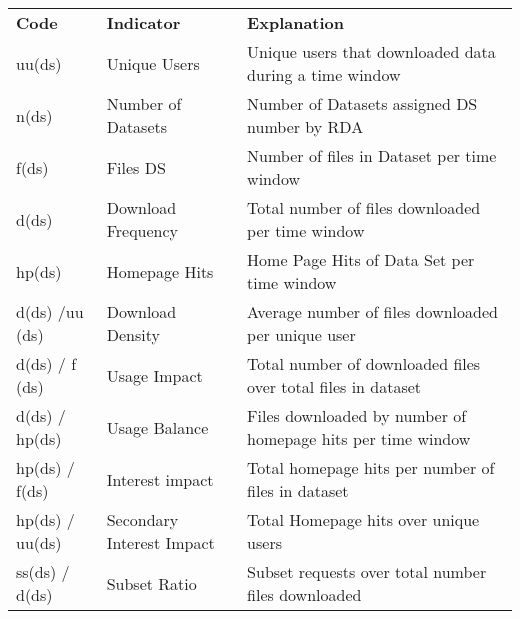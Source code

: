 \begin{table}[h]
\begin{tabular}{lll}
\textbf{Code}   & \textbf{Indicator}        & \textbf{Explanation}                                         \\
uu(ds)          & Unique Users              & Unique users that downloaded data during a time window       \\
n(ds)           & Number of Datasets        & Number of Datasets assigned DS number by RDA                 \\
f(ds)           & Files DS                  & Number of files in Dataset per time window                   \\
d(ds)           & Download Frequency        & Total number of files downloaded per time window             \\
hp(ds)          & Homepage Hits             & Home Page Hits of Data Set per time window                   \\
d(ds) /uu (ds)  & Download Density          & Average number of files downloaded per unique user           \\
d(ds) / f (ds)  & Usage Impact              & Total number of downloaded files over total files in dataset \\
d(ds) / hp(ds)  & Usage Balance             & Files downloaded by number of homepage hits per time window  \\
hp(ds) / f(ds)  & Interest impact           & Total homepage hits per number of files in dataset           \\
hp(ds) / uu(ds) & Secondary Interest Impact & Total Homepage hits over unique users                        \\
ss(ds) / d(ds)  & Subset Ratio              & Subset requests over total number files downloaded          
\end{tabular}
\end{table}